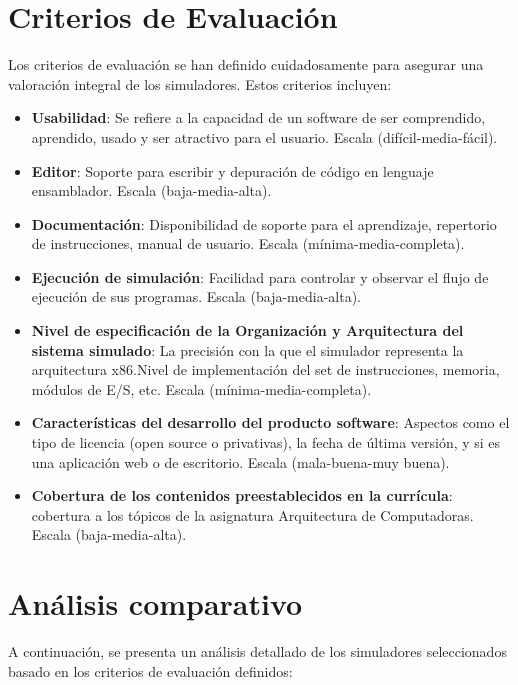 \documentclass[12pt,twoside]{templates/unerthesis}
\begin{document}
\hypertarget{criterios-de-evaluaciuxf3n}{%
\section{Criterios de Evaluación}\label{criterios-de-evaluaciuxf3n}}

Los criterios de evaluación se han definido cuidadosamente para asegurar una valoración integral de los simuladores. Estos criterios incluyen:

\begin{itemize}
\item
  \textbf{Usabilidad}: Se refiere a la capacidad de un software de ser comprendido, aprendido, usado y ser atractivo para el usuario. Escala (difícil-media-fácil).
\item
  \textbf{Editor}: Soporte para escribir y depuración de código en lenguaje ensamblador. Escala (baja-media-alta).
\item
  \textbf{Documentación}: Disponibilidad de soporte para el aprendizaje, repertorio de instrucciones, manual de usuario. Escala (mínima-media-completa).
\item
  \textbf{Ejecución de simulación}: Facilidad para controlar y observar el flujo de ejecución de sus programas. Escala (baja-media-alta).
\item
  \textbf{Nivel de especificación de la Organización y Arquitectura del sistema simulado}: La precisión con la que el simulador representa la arquitectura x86.Nivel de implementación del set de instrucciones, memoria, módulos de E/S, etc. Escala (mínima-media-completa).
\item
  \textbf{Características del desarrollo del producto software}: Aspectos como el tipo de licencia (open source o privativas), la fecha de última versión, y si es una aplicación web o de escritorio. Escala (mala-buena-muy buena).
\item
  \textbf{Cobertura de los contenidos preestablecidos en la currícula}: cobertura a los tópicos de la asignatura Arquitectura de Computadoras. Escala (baja-media-alta).
\end{itemize}

\hypertarget{anuxe1lisis-comparativo}{%
\section{Análisis comparativo}\label{anuxe1lisis-comparativo}}

A continuación, se presenta un análisis detallado de los simuladores seleccionados basado en los criterios de evaluación definidos:
\end{document}
